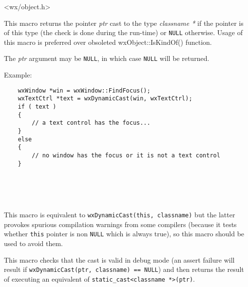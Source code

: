 
<wx/object.h>

\label{wxdynamiccast}


This macro returns the pointer {\it ptr} cast to the type {\it classname *} if
the pointer is of this type (the check is done during the run-time) or
{\tt NULL} otherwise. Usage of this macro is preferred over obsoleted
wxObject::IsKindOf() function.

The {\it ptr} argument may be {\tt NULL}, in which case {\tt NULL} will be
returned.

Example:

\begin{verbatim}
    wxWindow *win = wxWindow::FindFocus();
    wxTextCtrl *text = wxDynamicCast(win, wxTextCtrl);
    if ( text )
    {
        // a text control has the focus...
    }
    else
    {
        // no window has the focus or it is not a text control
    }
\end{verbatim}


\\
\\
\\

\label{wxdynamiccastthis}


This macro is equivalent to {\tt wxDynamicCast(this, classname)} but the
latter provokes spurious compilation warnings from some compilers (because it
tests whether {\tt this} pointer is non {\tt NULL} which is always true), so
this macro should be used to avoid them.



\label{wxstaticcast}


This macro checks that the cast is valid in debug mode (an assert failure will
result if {\tt wxDynamicCast(ptr, classname) == NULL}) and then returns the
result of executing an equivalent of {\tt static\_cast<classname *>(ptr)}.

